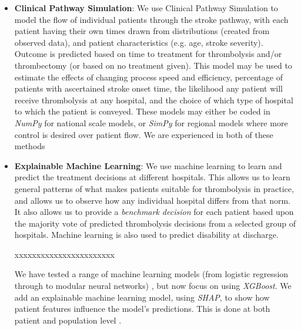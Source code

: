 \begin{itemize}
    \item \textbf{Clinical Pathway Simulation}: We use Clinical Pathway Simulation to model the flow of individual patients through the stroke pathway, with each patient having their own times drawn from distributions (created from observed data), and patient characteristics (e.g. age, stroke severity). Outcome is predicted based on time to treatment for thrombolysis and/or thrombectomy (or based on no treatment given). This model may be used to estimate the effects of changing process speed and efficiency, percentage of patients with ascertained stroke onset time, the likelihood any patient will receive thrombolysis at any hospital, and the choice of which type of hospital to which the patient is conveyed. These models may either be coded in \textit{NumPy} for national scale models, or \textit{SimPy} for regional models where more control is desired over patient flow. We are experienced in both of these methods \cite{allen_use_2022, allen_simulation_2020}

    \item \textbf{Explainable Machine Learning}: We use machine learning to learn and predict the treatment decisions at different hospitals. This allows us to learn general patterns of what makes patients suitable for thrombolysis in practice, and allows us to observe how any individual hospital differs from that norm. It also allows us to provide a \textit{benchmark decision} for each patient based upon the majority vote of predicted thrombolysis decisions from a selected group of hospitals. Machine learning is also used to predict disability at discharge.
    
    xxxxxxxxxxxxxxxxxxxxxxx
    
    We have tested a range of machine learning models (from logistic regression through to modular neural networks) \cite{allen_using_2022}, but now focus on using \textit{XGBoost}. We add an explainable machine learning model, using \textit{SHAP}, to show how patient features influence the model's predictions. This is done at both patient and population level \cite{pearn_what_2023}.  


\end{itemize}
